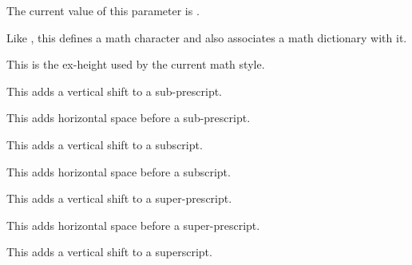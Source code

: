 \stopnewprimitive

\startnewprimitive[title={\prm {Umathdenominatorvariant}}]

The current value of this parameter is \CurrentMathVariant
\Umathdenominatorvariant.

\stopnewprimitive

\startnewprimitive[title={\prm {Umathdictdef}}]

Like , this defines a math character and also associates a
math dictionary with it.

\stopnewprimitive

\startnewprimitive[title={\prm {Umathexheight}}]

This is the ex-height used by the current math style.

\stopnewprimitive

\startnewprimitive[title={\prm {Umathextrasubpreshift}}]

This adds a vertical shift to a sub-prescript.

\stopnewprimitive

\startnewprimitive[title={\prm {Umathextrasubprespace}}]

This adds horizontal space before a sub-prescript.

\stopnewprimitive

\startnewprimitive[title={\prm {Umathextrasubshift}}]

This adds a vertical shift to a subscript.

\stopnewprimitive

\startnewprimitive[title={\prm {Umathextrasubspace}}]

This adds horizontal space before a subscript.

\stopnewprimitive

\startnewprimitive[title={\prm {Umathextrasuppreshift}}]

This adds a vertical shift to a super-prescript.

\stopnewprimitive

\startnewprimitive[title={\prm {Umathextrasupprespace}}]

This adds horizontal space before a super-prescript.

\stopnewprimitive

\startnewprimitive[title={\prm {Umathextrasupshift}}]

This adds a vertical shift to a superscript.

\stopnewprimitive

\startnewprimitive[title={\prm {Umathextrasupspace}}]

